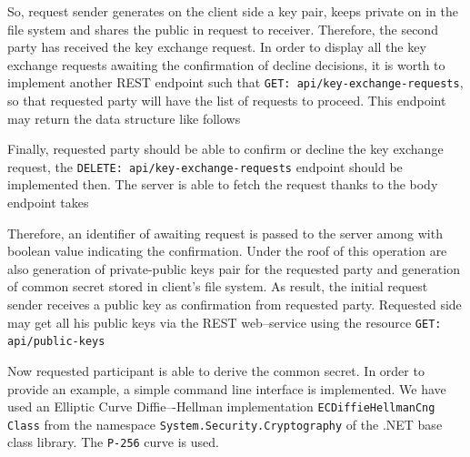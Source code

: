 \documentclass[12pt,letterpaper,oneside,reqno]{amsart}
\numberwithin{equation}{section}
\begin{document}
    

    So, request sender generates on the client side a key pair, keeps private on in the file system and shares the public
    in request to receiver.
    Therefore, the second party has received the key exchange request.
    In order to display all the key exchange requests awaiting the confirmation of decline decisions, it is worth to implement
    another REST endpoint such that \texttt{GET: api/key-exchange-requests}, so that requested party will have the list of
    requests to proceed.
    This endpoint may return the data structure like follows

    

    Finally, requested party should be able to confirm or decline the key exchange request, the
    \texttt{DELETE: api/key-exchange-requests} endpoint should be implemented then.
    The server is able to fetch the request thanks to the body endpoint takes

    

    Therefore, an identifier of awaiting request is passed to the server among with boolean value
    indicating the confirmation.
    Under the roof of this operation are also generation of private-public keys pair for the requested party and
    generation of common secret stored in client's file system.
    As result, the initial request sender receives a public key as confirmation from requested party.
    Requested side may get all his public keys via the REST web--service using the resource \texttt{GET: api/public-keys}

    

    Now requested participant is able to derive the common secret.
    In order to provide an example, a simple command line interface is implemented.
    We have used an Elliptic Curve Diffie–-Hellman implementation \texttt{ECDiffieHellmanCng Class} from the namespace
    \texttt{System.Security.Cryptography} of the .NET base class library.
    The \texttt{P-256} curve is used.
\end{document}

